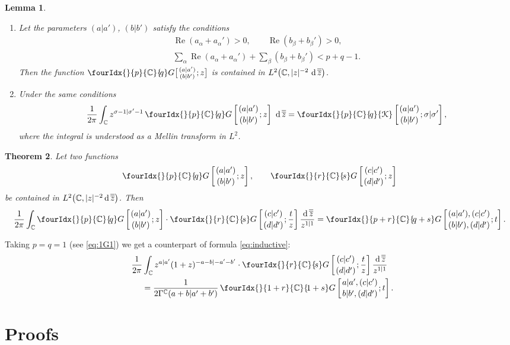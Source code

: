 \documentclass[pdftex]{sigma}
\numberwithin{equation}{section}
\newtheorem{Theorem}{Theorem}[section]
\newtheorem{Lemma}[Theorem]{Lemma}
\renewcommand{\Re}{\mathop {\mathrm {Re}}\nolimits}
\newcommand{\Kc}[2]{\fourIdx{}{#1}{\C}{\!#2}{\EuScript K}}
\newcommand{\Gc}[2]{\fourIdx{}{#1}{\C}{\!#2}G}
\renewcommand{\Re}{\mathop {\mathrm {Re}}\nolimits}
\def\C {{\mathbb C }}
\newcommand{\dd}[1]{\,{\rm d}\,{\overline{\overline{#1}}} }
\begin{document}
\begin{Lemma}\label{cor:1}\quad
\begin{enumerate}\itemsep=0pt
\item[$(a)$]
Let the parameters $(a|a')$, $(b|b')$ satisfy the conditions
\begin{gather*}
\Re(a_\alpha+a_\alpha')>0,\qquad \Re(b_\beta+b_\beta')>0,\\
\sum_\alpha \Re(a_\alpha+a_\alpha')+\sum_\beta(b_\beta+b_\beta')<p+q-1.
\end{gather*}
Then the function $\Gc{p}{q}\big[\genfrac{}{}{0pt}{}{(a|a')}{(b|b')};z\big]$
is contained in $L^2\big(\C,|z|^{-2}\,\dd z\big)$.
\item[$(b)$] Under the same conditions
\[
 \frac1{2\pi}\int_\C z^{\sigma-1|\sigma'-1}\,
\Gc{p}{q}\left[\genfrac{}{}{0pt}{}{(a|a')}{(b|b')};z\right] \, \dd z=
\Kc{p}{q}\left[\genfrac{}{}{0pt}{}{(a|a')}{(b|b')};\sigma|\sigma'\right],
\]
where the integral is understood as a Mellin transform in $L^2$.
\end{enumerate}
\end{Lemma}

\begin{Theorem}
\label{cor:2}
Let two functions
\[
\Gc{p}{q}\left[\genfrac{}{}{0pt}{}{(a|a')}{(b|b')};z\right],\qquad
\Gc{r}{s}\left[\genfrac{}{}{0pt}{}{(c|c')}{(d|d')};z\right]
\]
be contained in $L^2\big(\C, |z|^{-2}\dd z\big)$.
Then
\begin{equation}
\frac 1{2\pi}
\int_\C
\Gc{p}{q}\left[\genfrac{}{}{0pt}{}{(a|a')}{(b|b')};z\right] \cdot
\Gc{r}{s}\left[\genfrac{}{}{0pt}{}{(c|c')}{(d|d')};\frac{t}{z}\right]
\frac{\dd z}{z^{1|1}} =
\Gc{p+r}{q+s}\left[\genfrac{}{}{0pt}{}{(a|a'),(c|c')}
{(b|b'),(d|d')};t\right].
\label{eq:convolutions}
\end{equation}
\end{Theorem}

Taking $p=q=1$ (see \eqref{eq:1G1}) we get a counterpart of formula
\eqref{eq:inductive}:
\begin{gather*}
\frac 1{2\pi}\int_\C z^{a|a'}(1+z)^{-a-b|-a'-b'} \cdot
\Gc{r}{s}\left[\genfrac{}{}{0pt}{}{(c|c')}{(d|d')};\frac{t}{z}\right]
\frac{\dd z}{z^{1|1}} \\
\qquad{} =\frac 1{2\Gamma^\C(a+b|a'+b')}\,
\Gc{1+r}{1+s}\left[\genfrac{}{}{0pt}{}{a|a',(c|c')}{b|b',(d|d')};t\right].
\end{gather*}

\section{Proofs}\label{section2}
\end{document}
